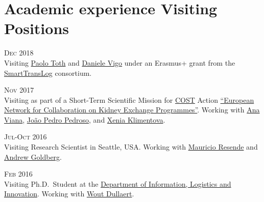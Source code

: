 \section*{Academic experience {\small Visiting Positions}}

\begin{paracol}{2}
  \textsc{Dec 2018}
\switchcolumn
  \\
  Visiting \href{https://scholar.google.it/citations?user=2IPL4XIAAAAJ}{Paolo Toth} and \href{https://scholar.google.com/citations?user=2kk8d_AAAAAJ}{Daniele Vigo} under an Erasmus+ grant from the \href{https://smarttranslog.wordpress.com/}{SmartTransLog} consortium.
\end{paracol}

\begin{paracol}{2}
  \textsc{Nov 2017}
\switchcolumn
  \\
  Visiting as part of a Short-Term Scientific Mission for \href{http://www.cost.eu/}{COST} Action \href{http://www.enckep-cost.eu/}{``European Network for Collaboration on Kidney Exchange Programmes''}.
  Working with \href{https://scholar.google.com/citations?user=RW7QevYAAAAJ}{Ana Viana}, \href{https://scholar.google.it/citations?user=aWTZf_AAAAAJ}{João Pedro Pedroso}, and \href{http://orcid.org/0000-0003-1085-0810}{Xenia Klimentova}.
\end{paracol}

\begin{paracol}{2}
  \textsc{Jul-Oct 2016}
\switchcolumn
  \\
  Visiting Research Scientist in Seattle, USA. Working with \href{https://scholar.google.com/citations?user=KTmPx50AAAAJ}{Mauricio Resende} and \href{https://scholar.google.it/citations?user=U5iFVowAAAAJ}{Andrew Goldberg}.
\end{paracol}

\begin{paracol}{2}
  \textsc{Feb 2016}
\switchcolumn
  \\
  Visiting Ph.D.\ Student at the \href{https://sbe.vu.nl/en/departments-and-institutes/information-logistics-and-innovation/index.aspx}{Department of Information, Logistics and Innovation}. Working with \href{https://scholar.google.com/citations?user=wjjCd5UAAAAJ}{Wout Dullaert}.
\end{paracol}

